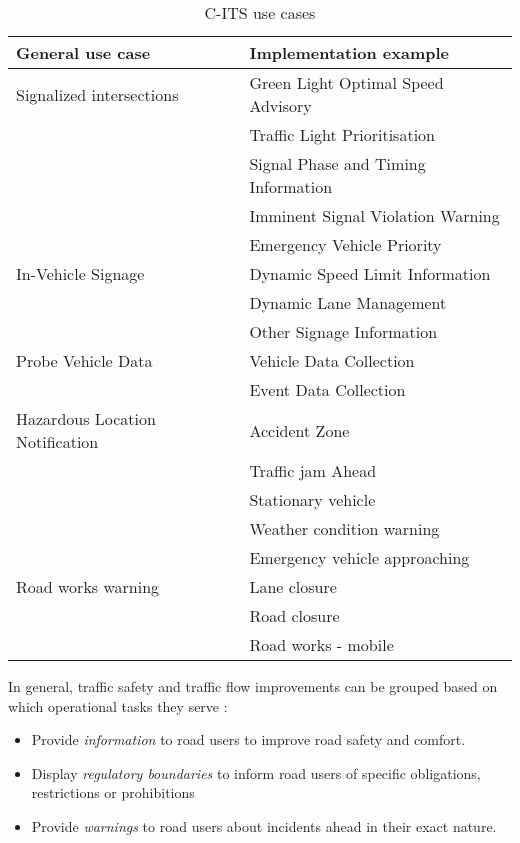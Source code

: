 \documentclass[main.tex]{subfiles}
\begin{document}
\begin{table}[htbp]
    \centering\begin{tabular}{ll}
        \toprule
        \textbf{General use case} & \textbf{Implementation example} \\ \midrule
        Signalized intersections & Green Light Optimal Speed Advisory \\ 
        & Traffic Light Prioritisation \\
        & Signal Phase and Timing Information \\
        & Imminent Signal Violation Warning \\ 
        & Emergency Vehicle Priority \\ \midrule
        In-Vehicle Signage & Dynamic Speed Limit Information \\ 
        & Dynamic Lane Management \\ 
        & Other Signage Information \\ 
        \midrule
        Probe Vehicle Data & Vehicle Data Collection \\ 
        & Event Data Collection \\ 
        \midrule
        Hazardous Location Notification & Accident Zone \\ 
        & Traffic jam Ahead \\ 
        & Stationary vehicle\\ 
        & Weather condition warning \\ 
        & Emergency vehicle approaching \\ 
        \midrule
        Road works warning & Lane closure \\ 
        & Road closure \\ 
        & Road works - mobile \\ \bottomrule
    \end{tabular}
    \caption{C-ITS use cases \cite{2022}}
    \label{c-its-use-case}
\end{table}


In general, traffic safety and traffic flow improvements can be grouped based on which 
operational tasks they serve \cite{CRoads2021}: 

\begin{itemize}
    \item Provide \emph{information} to road users to improve road safety and comfort.
    \item Display \emph{regulatory boundaries} to inform road users of specific obligations, 
    restrictions or prohibitions
    \item Provide \emph{warnings} to road users about incidents ahead in their exact nature. 
\end{itemize}
\end{document}
